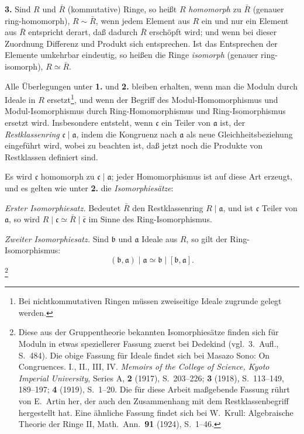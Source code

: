 \documentclass[12pt,a4paper]{article}
\theoremstyle{plain}
\theoremstyle{definition}
\theoremstyle{remark}
\begin{document}
\medskip
\noindent
\textbf{3.} Sind $R$ und $\bar{R}$ (kommutative) Ringe, so heißt $R$ \textit{homomorph} zu $\bar{R}$ (genauer ring-homomorph), $R \sim \bar{R}$, wenn jedem Element aus $R$ ein und nur ein Element aus $\bar{R}$ entspricht derart, daß dadurch $\bar{R}$ erschöpft wird; und wenn bei dieser Zuordnung Differenz und Produkt sich entsprechen. Ist das Entsprechen der Elemente umkehrbar eindeutig, so heißen die Ringe \textit{isomorph} (genauer ring-isomorph), $R \simeq \bar{R}$.

Alle Überlegungen unter \textbf{1.} und \textbf{2.} bleiben erhalten, wenn man die Moduln durch Ideale in $R$ ersetzt\footnote{Bei nichtkommutativen Ringen müssen zweiseitige Ideale zugrunde gelegt werden.}, und wenn der Begriff des Modul-Homomorphismus und Modul-Isomorphismus durch Ring-Homomorphismus und Ring-Isomorphismus ersetzt wird. Insbesondere entsteht, wenn $\mathfrak{c}$ ein Teiler von $\mathfrak{a}$ ist, der \textit{Restklassenring} $\mathfrak{c} \mid \mathfrak{a}$, indem die Kongruenz nach $\mathfrak{a}$ als neue Gleichheitsbeziehung eingeführt wird, wobei zu beachten ist, daß jetzt noch die Produkte von Restklassen definiert sind.

Es wird $\mathfrak{c}$ homomorph zu $\mathfrak{c} \mid \mathfrak{a}$; jeder Homomorphismus ist auf diese Art erzeugt, und es gelten wie unter \textbf{2.} die \textit{Isomorphiesätze}:

\textit{Erster Isomorphiesatz.} Bedeutet $\bar{R}$ den Restklassenring $R \mid \mathfrak{a}$, und ist $\mathfrak{c}$ Teiler von $\mathfrak{a}$, so wird $R \mid \mathfrak{c} \simeq \bar{R} \mid \bar{\mathfrak{c}}$ im Sinne des Ring-Isomorphismus.

\textit{Zweiter Isomorphiesatz.} Sind $\mathfrak{b}$ und $\mathfrak{a}$ Ideale aus $R$, so gilt der Ring-Isomorphismus:
\[
(\mathfrak{b}, \mathfrak{a}) \mid \mathfrak{a} \simeq \mathfrak{b} \mid [\mathfrak{b}, \mathfrak{a}].
\]%
\footnote{Diese aus der Gruppentheorie bekannten Isomorphiesätze finden sich für Moduln in etwas speziellerer Fassung zuerst bei Dedekind (vgl.\ 3.~Aufl., S.~484). Die obige Fassung für Ideale findet sich bei Masazo Sono: On Congruences. I., II., III, IV. \textit{Memoirs of the College of Science, Kyoto Imperial University}, Series A, \textbf{2} (1917), S.~203--226; \textbf{3} (1918), S.~113--149, 189--197; \textbf{4} (1919), S.~1--20. Die für diese Arbeit maßgebende Fassung rührt von E.~Artin her, der auch den Zusammenhang mit dem Restklassenbegriff hergestellt hat. Eine ähnliche Fassung findet sich bei W.~Krull: Algebraische Theorie der Ringe II, Math.\ Ann.\ \textbf{91} (1924), S.~1--46.}
\end{document}
